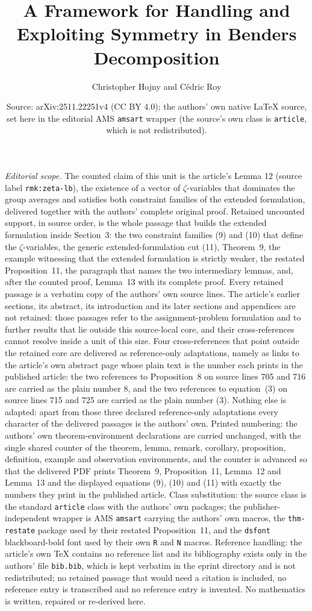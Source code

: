 \documentclass[10pt,a4paper]{amsart}
\title{A Framework for Handling and Exploiting Symmetry in Benders Decomposition}
\author{Christopher Hojny and C\'edric Roy}
\date{Source: arXiv:2511.22251v4 (CC BY 4.0); the authors' own native \LaTeX{} source, set here in the editorial AMS \texttt{amsart} wrapper (the source's own class is \texttt{article}, which is not redistributed).}
\theoremstyle{definition}
\begin{document}
\maketitle
\noindent\textit{Editorial scope.} The counted claim of this unit is the article's Lemma 12 (source label \texttt{rmk:zeta-lb}), the existence of a vector of $\zeta$-variables that dominates the group averages and satisfies both constraint families of the extended formulation, delivered together with the authors' complete original proof. Retained uncounted support, in source order, is the whole passage that builds the extended formulation inside Section~3: the two constraint families (9) and (10) that define the $\zeta$-variables, the generic extended-formulation cut (11), Theorem~9, the example witnessing that the extended formulation is strictly weaker, the restated Proposition~11, the paragraph that names the two intermediary lemmas, and, after the counted proof, Lemma~13 with its complete proof. Every retained passage is a verbatim copy of the authors' own source lines. The article's earlier sections, its abstract, its introduction and its later sections and appendices are not retained: those passages refer to the assignment-problem formulation and to further results that lie outside this source-local core, and their cross-references cannot resolve inside a unit of this size. Four cross-references that point outside the retained core are delivered as reference-only adaptations, namely as links to the article's own abstract page whose plain text is the number each prints in the published article: the two references to Proposition~8 on source lines 705 and 716 are carried as the plain number 8, and the two references to equation~(3) on source lines 715 and 725 are carried as the plain number (3). Nothing else is adapted: apart from those three declared reference-only adaptations every character of the delivered passages is the authors' own. Printed numbering: the authors' own theorem-environment declarations are carried unchanged, with the single shared counter of the theorem, lemma, remark, corollary, proposition, definition, example and observation environments, and the counter is advanced so that the delivered PDF prints Theorem~9, Proposition~11, Lemma~12 and Lemma~13 and the displayed equations (9), (10) and (11) with exactly the numbers they print in the published article. Class substitution: the source class is the standard \texttt{article} class with the authors' own packages; the publisher-independent wrapper is AMS \texttt{amsart} carrying the authors' own macros, the \texttt{thm-restate} package used by their restated Proposition~11, and the \texttt{dsfont} blackboard-bold font used by their own \texttt{R} and \texttt{N} macros. Reference handling: the article's own TeX contains no reference list and its bibliography exists only in the authors' file \texttt{bib.bib}, which is kept verbatim in the eprint directory and is not redistributed; no retained passage that would need a citation is included, no reference entry is transcribed and no reference entry is invented. No mathematics is written, repaired or re-derived here.
\end{document}
